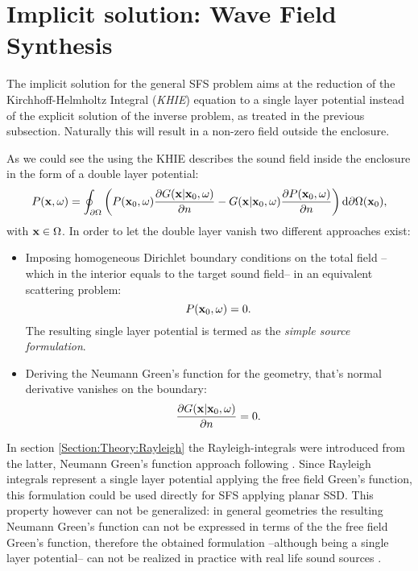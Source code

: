 
\newpage

\section{Implicit solution: Wave Field Synthesis}

The implicit solution for the general SFS problem aims at the reduction of the Kirchhoff-Helmholtz Integral (\emph{KHIE}) equation to a single layer potential instead of the explicit solution of the inverse problem, as treated in the previous subsection. Naturally this will result in a non-zero field outside the enclosure.

As we could see the using the KHIE describes the sound field inside the enclosure in the form of a double layer potential:
\begin{equation}
P(\mathbf{x},\omega) = 
\oint_{\partial \Omega}  \left( 
P(\mathbf{x}_0,\omega)  \frac{\partial G(\mathbf{x}|\mathbf{x}_0,\omega)}{\partial n}  -  
G(\mathbf{x}|\mathbf{x}_0,\omega) \frac{\partial P(\mathbf{x}_0,\omega)}{\partial n} 
\right)   \mathrm{d} \partial \Omega ( \mathbf{x}_0),
\end{equation}
with $\mathbf{x} \in \Omega$.
In order to let the double layer vanish two different approaches exist:
\begin{itemize}
\item Imposing homogeneous Dirichlet boundary conditions on the total field --which in the interior equals to the target sound field-- in an equivalent scattering problem: 
\begin{equation}
P(\mathbf{x}_0,\omega) = 0.
\end{equation}
The resulting single layer potential is termed as the \emph{simple source formulation}.
\item Deriving the Neumann Green's function for the geometry, that's normal derivative vanishes on the boundary:
\begin{equation}
\frac{\partial G(\mathbf{x}|\mathbf{x}_0,\omega)}{\partial n}  = 0.
\end{equation}
\end{itemize}
In section \ref{Section:Theory:Rayleigh} the Rayleigh-integrals were introduced from the latter, Neumann Green's function approach following \cite{Berkhout1984}. Since Rayleigh integrals represent a single layer potential applying the free field Green's function, this formulation could be used directly for SFS applying planar SSD. 
This property however can not be generalized: in general geometries the resulting Neumann Green's function can not be expressed in terms of the the free field Green's function, therefore the obtained formulation --although being a single layer potential-- can not be realized in practice with real life sound sources \cite{Schultz2014:Comparing_approaches}.

